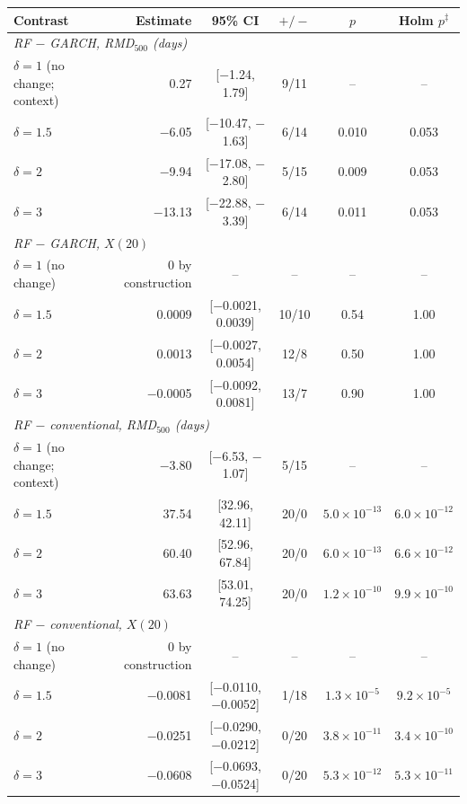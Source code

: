 \begin{tabular}{lrcccc}
\toprule
Contrast & Estimate & 95\% CI & $+/-$ & $p$ & Holm $p^{\ddagger}$ \\
\midrule
\multicolumn{6}{l}{\emph{RF $-$ GARCH, RMD$_{500}$ (days)}} \\
\quad $\delta=1$ (no change; context) & 0.27 & [$-$1.24, 1.79] & 9/11 & -- & -- \\
\quad $\delta=1.5$ & $-$6.05 & [$-$10.47, $-$1.63] & 6/14 & 0.010 & 0.053 \\
\quad $\delta=2$ & $-$9.94 & [$-$17.08, $-$2.80] & 5/15 & 0.009 & 0.053 \\
\quad $\delta=3$ & $-$13.13 & [$-$22.88, $-$3.39] & 6/14 & 0.011 & 0.053 \\
\multicolumn{6}{l}{\emph{RF $-$ GARCH, $X(20)$}} \\
\quad $\delta=1$ (no change) & 0 by construction & -- & -- & -- & -- \\
\quad $\delta=1.5$ & 0.0009 & [$-$0.0021, 0.0039] & 10/10 & 0.54 & 1.00 \\
\quad $\delta=2$ & 0.0013 & [$-$0.0027, 0.0054] & 12/8 & 0.50 & 1.00 \\
\quad $\delta=3$ & $-$0.0005 & [$-$0.0092, 0.0081] & 13/7 & 0.90 & 1.00 \\
\multicolumn{6}{l}{\emph{RF $-$ conventional, RMD$_{500}$ (days)}} \\
\quad $\delta=1$ (no change; context) & $-$3.80 & [$-$6.53, $-$1.07] & 5/15 & -- & -- \\
\quad $\delta=1.5$ & 37.54 & [32.96, 42.11] & 20/0 & $5.0\times10^{-13}$ & $6.0\times10^{-12}$ \\
\quad $\delta=2$ & 60.40 & [52.96, 67.84] & 20/0 & $6.0\times10^{-13}$ & $6.6\times10^{-12}$ \\
\quad $\delta=3$ & 63.63 & [53.01, 74.25] & 20/0 & $1.2\times10^{-10}$ & $9.9\times10^{-10}$ \\
\multicolumn{6}{l}{\emph{RF $-$ conventional, $X(20)$}} \\
\quad $\delta=1$ (no change) & 0 by construction & -- & -- & -- & -- \\
\quad $\delta=1.5$ & $-$0.0081 & [$-$0.0110, $-$0.0052] & 1/18 & $1.3\times10^{-5}$ & $9.2\times10^{-5}$ \\
\quad $\delta=2$ & $-$0.0251 & [$-$0.0290, $-$0.0212] & 0/20 & $3.8\times10^{-11}$ & $3.4\times10^{-10}$ \\
\quad $\delta=3$ & $-$0.0608 & [$-$0.0693, $-$0.0524] & 0/20 & $5.3\times10^{-12}$ & $5.3\times10^{-11}$ \\
\bottomrule
\end{tabular}
